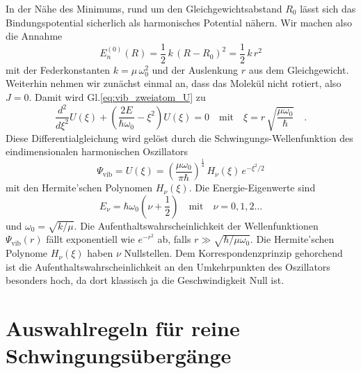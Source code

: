 In der Nähe des Minimums, rund um den Gleichgewichtsabstand $R_0$ lässt sich das Bindungspotential sicherlich als harmonisches Potential nähern. Wir machen also die Annahme
\begin{equation}
E_n^{(0)}(R)  = \frac{1}{2} \, k \, (R - R_0 )^2 = \frac{1}{2} \, k \, r^2 
\end{equation}
mit der Federkonstanten $k = \mu \, \omega_0^2$ und der Auslenkung $r$ aus dem Gleichgewicht. Weiterhin nehmen wir zunächst einmal an, dass das Molekül nicht rotiert, also $J=0$.  Damit wird Gl.\ref{eq:vib_zweiatom_U} zu
\begin{equation}
 \frac{d^2}{d \xi^2} U(\xi) + \left( \frac{2 E }{\hbar \omega_0}  - \xi^2  \right) U(\xi) = 0 \quad \text{mit} \quad \xi =  r \, \sqrt{\frac{\mu \omega_0}{\hbar}  } \quad .
\end{equation}
Diese Differentialgleichung wird gelöst durch die Schwingungs-Wellenfunktion des eindimensionalen harmonischen Oszillators
\begin{equation}
\Psi_\text{vib} =  U(\xi) = \left(\frac{\mu \omega_0}{\pi \hbar} \right)^{\frac{1}{4}} \,
 H_\nu(\xi) \, e^{- \xi^2 /2}
\end{equation}
mit den Hermite'schen Polynomen $H_\nu(\xi)$.
Die Energie-Eigenwerte sind
\begin{equation}
E_\nu = \hbar \omega_0 \left(\nu + \frac{1}{2} \right) \quad \text{mit} \quad \nu = 0, 1, 2 \dots
\end{equation}
und $\omega_0 = \sqrt{k / \mu}$. Die Aufenthaltswahrscheinlichkeit der Wellenfunktionen $\Psi_\text{vib}(r)$ fällt exponentiell wie $e^{-r^2}$ ab, falls $r \gg \sqrt{\hbar / \mu \omega_0}$. Die Hermite'schen Polynome $H_\nu(\xi)$ haben $\nu$ Nullstellen. Dem Korrespondenzprinzip gehorchend ist die 
Aufenthaltswahrscheinlichkeit an den Umkehrpunkten des Oszillators besonders hoch, da dort klassisch ja die Geschwindigkeit Null ist.


\begin{marginfigure}
\caption{Die Eigenfunktionen des quantenmechanischen harmonischen Oszillators für $\nu = 0 \dots 5$ (dünne Linie) und die Aufenthaltswahrscheinlichkeit (gefüllte Kurven). Die Position in y-Richtung entspricht der Eigen-Energie des Zustands auf der Skala des parabelförmigen Bindungspotentials im Hintergrund.
\label{fig:vib_1d_WF}}
\end{marginfigure}


\section{Auswahlregeln für reine Schwingungsübergänge}


